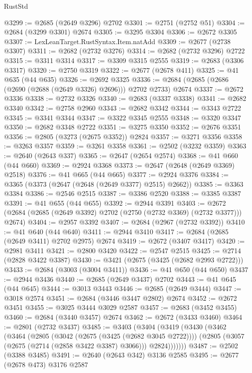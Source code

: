 \begin{lexlean}{RustStd}
\begin{coremodule}
{\begin{coremodule}
{{{{{{{{{{{{{{{{{{{{{{{{{{@3299 := @2685 (@2649 @3296) @2702
@3301 := @2751 (@2752 @51)
@3304 := @2684 (@3299 @3301) @2674
@3305 := @3295 @3304
@3306 := @2672 @3305
@3307 := LexLeanTarget.RustSyntax.Item.natAdd
@3309 := @2677 (@2738 @3307)
@3311 := @2682 (@2732 @3276)
@3314 := @2682 (@2732 @3296) @2722
@3315 := @3311 @3314
@3317 := @3309 @3315 @2555
@3319 := @2683 (@3306 @3317)
@3320 := @2750 @3319
@3322 := @2677 (@2678 @411)
@3325 := @41 @635 (@44 @635)
@3326 := @2692 @3325
@3336 := @2684 (@2685 (@2686 (@2690 (@2688 (@2649 @3326) @2696))) @2702 @2733) @2674
@3337 := @2672 @3336
@3338 := @2732 @3326
@3340 := @2683 (@3337 @3338)
@3341 := @2682 @3340
@3342 := @2758 @2960
@3343 := @2682 @3342
@3344 := @3343 @2722
@3345 := @3341 @3344
@3347 := @3322 @3345 @2555
@3348 := @3320 @3347
@3350 := @2682 @3348 @2722
@3351 := @3275 @3350
@3352 := @2676 @3351
@3356 := @2805 (@3273 (@2675 @3352)) @2824
@3357 := @3271 @3356
@3358 := @3263 @3357
@3359 := @3261 @3358
@3361 := @2502 (@3232 @3359)
@3363 := @2640 (@2643 @337)
@3365 := @2647 (@2654 @2574)
@3368 := @41 @660 (@44 @660)
@3369 := @2924 @3368
@3373 := @2647 (@2648 (@2649 @3369) @2518)
@3376 := @41 @665 (@44 @665)
@3377 := @2924 @3376
@3384 := @3365 (@3373 (@2647 (@2648 (@2649 @3377) @2515) @2662))
@3385 := @3363 @3384
@3386 := @2546 @2515
@3387 := @3386 @2520
@3388 := @3385 @3387
@3391 := @41 @655 (@44 @655)
@3392 := @2944 @3391
@3403 := @2672 (@2684 (@2685 (@2649 @3392) @2702 (@2750 (@2732 @3369) (@2732 @3377))) @2674)
@3404 := @2957 @3392
@3407 := @2684 (@2967 (@2732 @3392))
@3410 := @41 @640 (@44 @640)
@3411 := @2944 @3410
@3417 := @2684 (@2685 (@2649 @3411) @2702 @2975) @2674
@3419 := @2672 (@3407 @3417)
@3420 := @2981 @3411
@3421 := @2800 @3420
@3422 := @2547 @2515
@3425 := @2714 (@2828 @3422 @3387)
@3430 := @3421 (@2675 (@3425 (@2682 @2993 @2722)))
@3433 := @2684 (@3003 (@3004 @3411))
@3436 := @41 @650 (@44 @650)
@3437 := @2944 @3436
@3440 := @2685 (@2649 @3437) @2702
@3443 := @41 @645 (@44 @645)
@3444 := @3013 @3443
@3446 := @2685 (@2649 @3444)
@3447 := @3018 @2574
@3451 := @2684 (@3446 @3447 @2802) @2674
@3452 := @2672 @3451
@3455 := @3025 @3444 @3029 @2587
@3457 := @2683 (@3452 @3455)
@3460 := @2684 (@3440 @3457) @2674
@3462 := @2672 (@3433 @3460)
@3464 := @2801 (@2732 @3437)
@3485 := @3403
    (@3404
      (@3419
        (@3430
          (@3462
            (@3464
              (@2805
                (@3042 (@2675 (@3425 (@2682 @3045 @2722))))
                (@2805 (@3057 (@2675 (@2714 (@2858 @3422 @3387) @3066))) @2824)))))))
@3487 := @2502 (@3388 @3485)
@3491 := @2640 (@2643 @342) @3136 @2585
@3495 := @2677 (@2678 @473) @3176 @2587
}}}}}}}}}}}}}}}}}}}}}}}}}}
\end{coremodule}}
\end{coremodule}
\end{lexlean}
